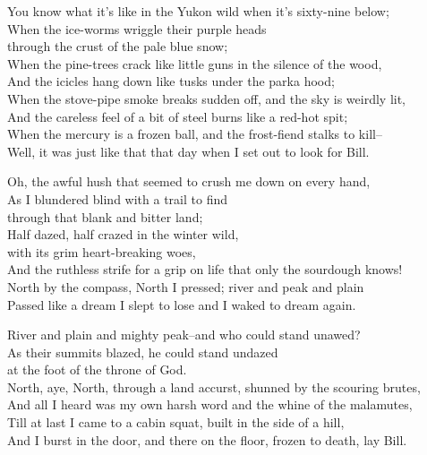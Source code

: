 \begin{poemblock}
You know what it's like in the Yukon wild when it's sixty-nine below;\\
When the ice-worms wriggle their purple heads\\
\idt through the crust of the pale blue snow;\\
When the pine-trees crack like little guns in the silence of the wood,\\
And the icicles hang down like tusks under the parka hood;\\
When the stove-pipe smoke breaks sudden off, and the sky is weirdly lit,\\
And the careless feel of a bit of steel burns like a red-hot spit;\\
When the mercury is a frozen ball, and the frost-fiend stalks to kill--\\
Well, it was just like that that day when I set out to look for Bill.

Oh, the awful hush that seemed to crush me down on every hand,\\
As I blundered blind with a trail to find\\
\idt through that blank and bitter land;\\
Half dazed, half crazed in the winter wild,\\
\idt with its grim heart-breaking woes,\\
And the ruthless strife for a grip on life that only the sourdough knows!\\
North by the compass, North I pressed; river and peak and plain\\
Passed like a dream I slept to lose and I waked to dream again.

River and plain and mighty peak--and who could stand unawed?\\
As their summits blazed, he could stand undazed\\
\idt at the foot of the throne of God.\\
North, aye, North, through a land accurst, shunned by the scouring brutes,\\
And all I heard was my own harsh word and the whine of the malamutes,\\
Till at last I came to a cabin squat, built in the side of a hill,\\
And I burst in the door, and there on the floor, frozen to death, lay Bill.


\end{poemblock}
